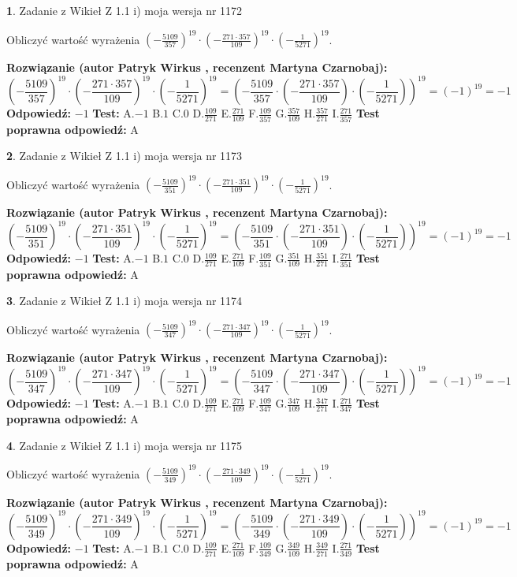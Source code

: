 \documentclass[12pt, a4paper]{article}
\theoremstyle{definition} %
\newtheorem{zad}{}
\newcommand{\zadStart}[1]{\begin{zad}#1\newline}
\newcommand{\zadStop}{\end{zad}}
\newcommand{\rozwStart}[2]{\noindent \textbf{Rozwiązanie (autor #1 , recenzent #2): }\newline}
\newcommand{\rozwStop}{\newline}
\newcommand{\odpStart}{\noindent \textbf{Odpowiedź:}\newline}
\newcommand{\odpStop}{\newline}
\newcommand{\testStart}{\noindent \textbf{Test:}\newline}
\newcommand{\testStop}{\newline}
\newcommand{\kluczStart}{\noindent \textbf{Test poprawna odpowiedź:}\newline}
\newcommand{\kluczStop}{\newline}
\begin{document}
\zadStart{Zadanie z Wikieł Z 1.1 i) moja wersja nr 1172}

Obliczyć wartość wyrażenia $(-\frac{5109}{357})^{19} \cdot (-\frac{271 \cdot 357}{109})^{19} \cdot (-\frac{1}{5271})^{19}$.
\zadStop
\rozwStart{Patryk Wirkus}{Martyna Czarnobaj}
$$(-\frac{5109}{357})^{19} \cdot (-\frac{271 \cdot 357}{109})^{19} \cdot (-\frac{1}{5271})^{19} = (-\frac{5109}{357} \cdot (-\frac{271 \cdot 357}{109}) \cdot (-\frac{1}{5271}))^{19} = (-1)^{19} = -1$$
\rozwStop
\odpStart
$-1$
\odpStop
\testStart
A.$-1$ B.$1$ C.$0$ D.$\frac{109}{271}$ E.$\frac{271}{109}$
F.$\frac{109}{357}$ G.$\frac{357}{109}$
H.$\frac{357}{271}$
I.$\frac{271}{357}$
\testStop
\kluczStart
A
\kluczStop



\zadStart{Zadanie z Wikieł Z 1.1 i) moja wersja nr 1173}

Obliczyć wartość wyrażenia $(-\frac{5109}{351})^{19} \cdot (-\frac{271 \cdot 351}{109})^{19} \cdot (-\frac{1}{5271})^{19}$.
\zadStop
\rozwStart{Patryk Wirkus}{Martyna Czarnobaj}
$$(-\frac{5109}{351})^{19} \cdot (-\frac{271 \cdot 351}{109})^{19} \cdot (-\frac{1}{5271})^{19} = (-\frac{5109}{351} \cdot (-\frac{271 \cdot 351}{109}) \cdot (-\frac{1}{5271}))^{19} = (-1)^{19} = -1$$
\rozwStop
\odpStart
$-1$
\odpStop
\testStart
A.$-1$ B.$1$ C.$0$ D.$\frac{109}{271}$ E.$\frac{271}{109}$
F.$\frac{109}{351}$ G.$\frac{351}{109}$
H.$\frac{351}{271}$
I.$\frac{271}{351}$
\testStop
\kluczStart
A
\kluczStop



\zadStart{Zadanie z Wikieł Z 1.1 i) moja wersja nr 1174}

Obliczyć wartość wyrażenia $(-\frac{5109}{347})^{19} \cdot (-\frac{271 \cdot 347}{109})^{19} \cdot (-\frac{1}{5271})^{19}$.
\zadStop
\rozwStart{Patryk Wirkus}{Martyna Czarnobaj}
$$(-\frac{5109}{347})^{19} \cdot (-\frac{271 \cdot 347}{109})^{19} \cdot (-\frac{1}{5271})^{19} = (-\frac{5109}{347} \cdot (-\frac{271 \cdot 347}{109}) \cdot (-\frac{1}{5271}))^{19} = (-1)^{19} = -1$$
\rozwStop
\odpStart
$-1$
\odpStop
\testStart
A.$-1$ B.$1$ C.$0$ D.$\frac{109}{271}$ E.$\frac{271}{109}$
F.$\frac{109}{347}$ G.$\frac{347}{109}$
H.$\frac{347}{271}$
I.$\frac{271}{347}$
\testStop
\kluczStart
A
\kluczStop



\zadStart{Zadanie z Wikieł Z 1.1 i) moja wersja nr 1175}

Obliczyć wartość wyrażenia $(-\frac{5109}{349})^{19} \cdot (-\frac{271 \cdot 349}{109})^{19} \cdot (-\frac{1}{5271})^{19}$.
\zadStop
\rozwStart{Patryk Wirkus}{Martyna Czarnobaj}
$$(-\frac{5109}{349})^{19} \cdot (-\frac{271 \cdot 349}{109})^{19} \cdot (-\frac{1}{5271})^{19} = (-\frac{5109}{349} \cdot (-\frac{271 \cdot 349}{109}) \cdot (-\frac{1}{5271}))^{19} = (-1)^{19} = -1$$
\rozwStop
\odpStart
$-1$
\odpStop
\testStart
A.$-1$ B.$1$ C.$0$ D.$\frac{109}{271}$ E.$\frac{271}{109}$
F.$\frac{109}{349}$ G.$\frac{349}{109}$
H.$\frac{349}{271}$
I.$\frac{271}{349}$
\testStop
\kluczStart
A
\kluczStop
\end{document}
